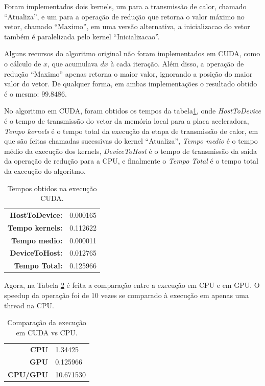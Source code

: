 \documentclass[conference]{IEEEtran}
\begin{document}
Foram implementados dois kernels, um para a transmissão de calor, chamado ``Atualiza'', e um para a operação de redução que retorna o valor máximo no vetor, chamado ``Maximo'', em uma versão alternativa, a inicializacao do vetor também é paralelizada pelo kernel ``Inicializacao''.

Alguns recursos do algoritmo original não foram implementados em CUDA, como o cálculo de $x$, que acumulava $dx$ à cada iteração. Além disso, a operação de redução ``Maximo'' apenas retorna o maior valor, ignorando a posição do maior valor do vetor. De qualquer forma, em ambas implementações o resultado obtido é o mesmo: $99.8486$.

No algoritmo em CUDA, foram obtidos os tempos da tabela\ref{tab:ex01-cuda}, onde \textit{HostToDevice} é o tempo de transmissão do vetor da memória local para a placa aceleradora, \textit{Tempo kernels} é o tempo total da execução da etapa de transmissão de calor, em que são feitas chamadas sucessivas do kernel ``Atualiza'', \textit{Tempo medio} é o tempo médio da execução dos kernels, \textit{DeviceToHost} é o tempo de transmissão da saída da operação de redução para a CPU, e finalmente o \textit{Tempo Total} é o tempo total da execução do algoritmo.

\begin{table}[htb!]
\centering
\begin{tabular}{rl}
\bfseries HostToDevice: & 0.000165 \\
\bfseries Tempo kernels: & 0.112622 \\
\bfseries Tempo medio: & 0.000011 \\
\bfseries DeviceToHost: & 0.012765 \\
\bfseries Tempo Total: & 0.125966 \\
\end{tabular}
\caption{Tempos obtidos na execução CUDA.\label{tab:ex01-cuda}}

\end{table}

Agora, na Tabela \ref{tab:ex01-cpu} é feita a comparação entre a execução em CPU e em GPU. O speedup da operação foi de 10 vezes se comparado à execução em apenas uma thread na CPU.


\begin{table}[htb!]
\centering
\begin{tabular}{rl}
  \bfseries CPU & 1.34425 \\
  \bfseries GPU & 0.125966 \\
  \bfseries CPU/GPU & 10.671530 \\
\end{tabular}
\caption{Comparação da execução em CUDA vs CPU.\label{tab:ex01-cpu}}
\end{table}
\end{document}
